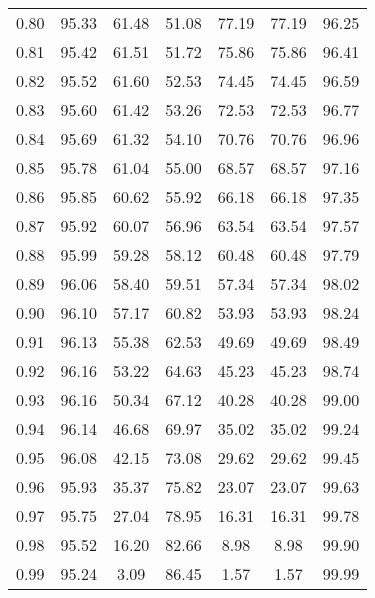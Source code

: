 \begin{tabular}{|c|c|c|c|c|c|c|}
      0.80 &     95.33 &     61.48 &      51.08 &   77.19 &      77.19 &         96.25 \\
      0.81 &     95.42 &     61.51 &      51.72 &   75.86 &      75.86 &         96.41 \\
      0.82 &     95.52 &     61.60 &      52.53 &   74.45 &      74.45 &         96.59 \\
      0.83 &     95.60 &     61.42 &      53.26 &   72.53 &      72.53 &         96.77 \\
      0.84 &     95.69 &     61.32 &      54.10 &   70.76 &      70.76 &         96.96 \\
      0.85 &     95.78 &     61.04 &      55.00 &   68.57 &      68.57 &         97.16 \\
      0.86 &     95.85 &     60.62 &      55.92 &   66.18 &      66.18 &         97.35 \\
      0.87 &     95.92 &     60.07 &      56.96 &   63.54 &      63.54 &         97.57 \\
      0.88 &     95.99 &     59.28 &      58.12 &   60.48 &      60.48 &         97.79 \\
      0.89 &     96.06 &     58.40 &      59.51 &   57.34 &      57.34 &         98.02 \\
      0.90 &     96.10 &     57.17 &      60.82 &   53.93 &      53.93 &         98.24 \\
      0.91 &     96.13 &     55.38 &      62.53 &   49.69 &      49.69 &         98.49 \\
      0.92 &     96.16 &     53.22 &      64.63 &   45.23 &      45.23 &         98.74 \\
      0.93 &     96.16 &     50.34 &      67.12 &   40.28 &      40.28 &         99.00 \\
      0.94 &     96.14 &     46.68 &      69.97 &   35.02 &      35.02 &         99.24 \\
      0.95 &     96.08 &     42.15 &      73.08 &   29.62 &      29.62 &         99.45 \\
      0.96 &     95.93 &     35.37 &      75.82 &   23.07 &      23.07 &         99.63 \\
      0.97 &     95.75 &     27.04 &      78.95 &   16.31 &      16.31 &         99.78 \\
      0.98 &     95.52 &     16.20 &      82.66 &    8.98 &       8.98 &         99.90 \\
      0.99 &     95.24 &      3.09 &      86.45 &    1.57 &       1.57 &         99.99 \\
\bottomrule
\end{tabular}
